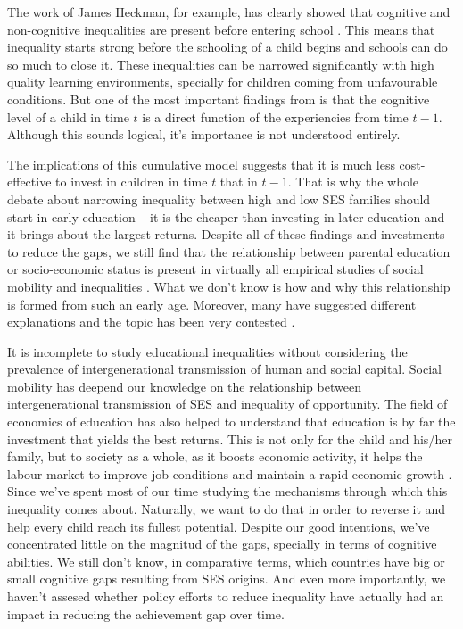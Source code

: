\documentclass[11pt, a4paper]{article}\usepackage[]{graphicx}\usepackage[]{color}
\begin{document}
The work of James Heckman, for example, has clearly showed that cognitive and non-cognitive inequalities are present before entering school \citep{heckman2006}. This means that inequality starts strong before the schooling of a child begins and schools can do so much to close it. These inequalities can be narrowed significantly with high quality learning environments, specially for children coming from unfavourable conditions. But one of the most important findings from \citet{cunha2006} is that the cognitive level of a child in time \(t\) is a direct function of the experiencies from time \(t-1\). Although this sounds logical, it's importance is not understood entirely.

The implications of this cumulative model suggests that it is much less cost-effective to invest in children in time \(t\) that in \(t-1\). That is why the whole debate about narrowing inequality between high and low SES families should start in early education -- it is the cheaper than investing in later education and it brings about the largest returns. Despite all of these findings and investments to reduce the gaps, we still find that the relationship between parental education or socio-economic status is present in virtually all empirical studies of social mobility and inequalities \citep{breen1997, breen2007, waldfogel2006, bradbury2015, chetty2016}. What we don't know is how and why this relationship is formed from such an early age. Moreover, many have suggested different explanations and the topic has been very contested \citep{brooks1997}.

It is incomplete to study educational inequalities without considering the prevalence of intergenerational transmission of human and social capital. Social mobility has deepend our knowledge on the relationship between intergenerational transmission of SES and inequality of opportunity. The field of economics of education has also helped to understand that education is by far the investment that yields the best returns. This is not only for the child and his/her family, but to society as a whole, as it boosts economic activity, it helps the labour market to improve job conditions and maintain a rapid economic growth \citep{hanushek2007}. Since \citet{coleman1966} we've spent most of our time studying the mechanisms through which this inequality comes about. Naturally, we want to do that in order to reverse it and help every child reach its fullest potential. Despite our good intentions, we've concentrated little on the magnitud of the gaps, specially in terms of cognitive abilities. We still don't know, in comparative terms, which countries have big or small cognitive gaps resulting from SES origins. And even more importantly, we haven't assesed whether policy efforts to reduce inequality have actually had an impact in reducing the achievement gap over time.
\end{document}
